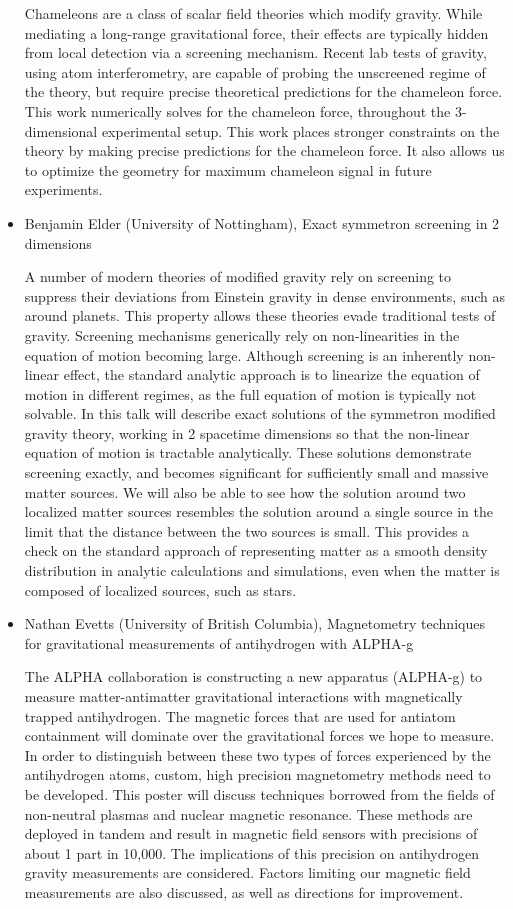 \documentclass[letterpaper,12pt]{article}
\newcommand{\talk}[2]{{\fontspec{Lato Bold} #1,} {\fontspec{Lato Italic} #2}}
\begin{document}
\begin{itemize}
Chameleons are a class of scalar field theories which modify gravity. While mediating a long-range gravitational force, their effects are typically hidden from local detection via a screening mechanism. Recent lab tests of gravity, using atom interferometry, are capable of probing the unscreened regime of the theory, but require precise theoretical predictions for the chameleon force. This work numerically solves for the chameleon force, throughout the 3-dimensional experimental setup. This work places stronger constraints on the theory by making precise predictions for the chameleon force. It also allows us to optimize the geometry for maximum chameleon signal in future experiments.	


\item \talk{Benjamin Elder (University of Nottingham)}{Exact symmetron screening in 2 dimensions}

A number of modern theories of modified gravity rely on screening to suppress their deviations from Einstein gravity in dense environments, such as around planets. This property allows these theories evade traditional tests of gravity. Screening mechanisms generically rely on non-linearities in the equation of motion becoming large.  Although screening is an inherently non-linear effect, the standard analytic approach is to linearize the equation of motion in different regimes, as the full equation of motion is typically not solvable. In this talk will describe exact solutions of the symmetron modified gravity theory, working in 2 spacetime dimensions so that the non-linear equation of motion is tractable analytically. These solutions demonstrate screening exactly, and becomes significant for sufficiently small and massive matter sources.  We will also be able to see how the solution around two localized matter sources resembles the solution around a single source in the limit that the distance between the two sources is small. This provides a check on the standard approach of representing matter as a smooth density distribution in analytic calculations and simulations, even when the matter is composed of localized sources, such as stars.


\item \talk{Nathan Evetts (University of British Columbia)}{Magnetometry techniques for gravitational measurements of antihydrogen with ALPHA-g}

The ALPHA collaboration is constructing a new apparatus (ALPHA-g) to measure matter-antimatter gravitational interactions with magnetically trapped antihydrogen. The magnetic forces that are used for antiatom containment will dominate over the gravitational forces we hope to measure. In order to distinguish between these two types of forces experienced by the antihydrogen atoms, custom, high precision magnetometry methods need to be developed. This poster will discuss techniques borrowed from the fields of non-neutral plasmas and nuclear magnetic resonance. These methods are deployed in tandem and result in magnetic field sensors with precisions of about 1 part in 10,000. The implications of this precision on antihydrogen gravity measurements are considered. Factors limiting our magnetic field measurements are also discussed, as well as directions for improvement.



\end{itemize}
\end{document}
